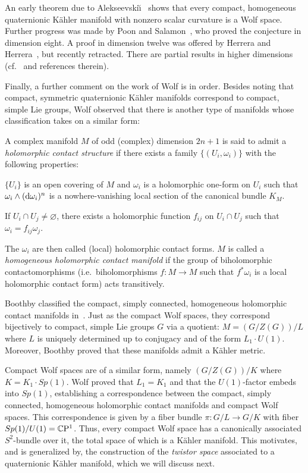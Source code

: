 An early theorem due to Alekseevski\u\i~\cite{Ale1968} shows that every compact, homogeneous quaternionic K\"ahler manifold with nonzero scalar curvature is a Wolf space. Further progress was made by Poon and Salamon~\cite{PS1991}, who proved the conjecture in dimension eight. A proof in dimension twelve was offered by Herrera and Herrera~\cite{HH2002}, but recently retracted. There are partial results in higher dimensions (cf.~\cite{Ama2012} and references therein).

Finally, a further comment on the work of Wolf is in order. Besides noting that compact, symmetric quaternionic K\"ahler manifolds correspond to compact, simple Lie groups, Wolf observed that there is another type of manifolds whose classification takes on a similar form:

\begin{mydef}\label{def:holoctcmnf}
	A complex manifold $M$ of odd (complex) dimension $2n+1$ is said to admit a \emph{holomorphic contact structure} if there exists a family $\{(U_i,\omega_i)\}$ with the following properties:
	\begin{numberedlist}
		\item $\{U_i\}$ is an open covering of $M$ and $\omega_i$ is a holomorphic one-form on $U_i$ such that $\omega_i\wedge (\mathrm{d}\omega_i)^n$ is a nowhere-vanishing local section of the canonical bundle $K_M$.
		\item If $U_i\cap U_j\neq \varnothing$, there exists a holomorphic function $f_{ij}$ on $U_i\cap U_j$ such that $\omega_i=f_{ij}\omega_j$.
	\end{numberedlist}
	The $\omega_i$ are then called (local) holomorphic contact forms. $M$ is called a \emph{homogeneous holomorphic contact manifold} if the group of biholomorphic contactomorphisms (i.e.~biholomorphisms $f:M\to M$ such that $f^*\omega_i$ is a local holomorphic contact form) acts transitively.
\end{mydef}

Boothby classified the compact, simply connected, homogeneous holomorphic contact manifolds in~\cite{Boo1961}. Just as the compact Wolf spaces, they correspond bijectively to compact, simple Lie groups $G$ via a quotient: $M=(G/Z(G))/L$ where $L$ is uniquely determined up to conjugacy and of the form $L_1\cdot U(1)$. Moreover, Boothby proved that these manifolds admit a K\"ahler metric.

Compact Wolf spaces are of a similar form, namely $(G/Z(G))/K$ where $K=K_1\cdot Sp(1)$. Wolf proved that $L_1=K_1$ and that the $U(1)$-factor embeds into $Sp(1)$, establishing a correspondence between the compact, simply connected, homogeneous holomorphic contact manifolds and compact Wolf spaces. This correspondence is given by a fiber bundle $\pi: G/L\to G/K$ with fiber $Sp(1)/U(1)=\mathbb{C}\mathrm{P}^1$. Thus, every compact Wolf space has a canonically associated $S^2$-bundle over it, the total space of which is a K\"ahler manifold. This motivates, and is generalized by, the construction of the \emph{twistor space} associated to a quaternionic K\"ahler manifold, which we will discuss next.

